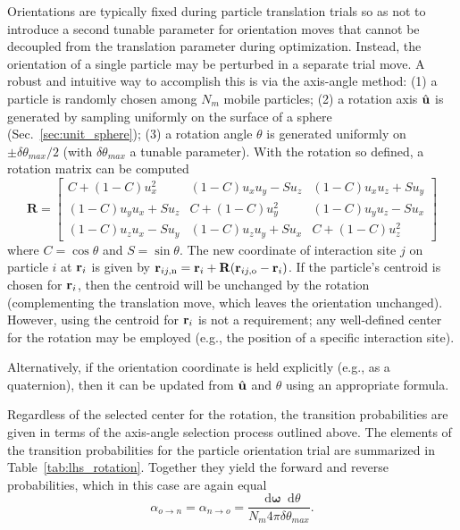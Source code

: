 \documentclass[
  9pt,
  bestpractices,
  pubversion,
]{livecoms}
\newcommand*\diff{\mathop{}\!\mathrm{d}}
\begin{document}
Orientations are typically fixed during particle translation trials so as not to introduce a second tunable parameter for orientation moves that cannot be decoupled from the translation parameter during optimization.
Instead, the orientation of a single particle may be perturbed in a separate trial move.
A robust and intuitive way to accomplish this is via the axis-angle method: (1) a particle is randomly chosen among $N_m$ mobile particles; (2) a rotation axis $\hat {\bf u}$ is generated by sampling uniformly on the surface of a sphere (Sec.~\ref{sec:unit_sphere}); (3) a rotation angle $\theta$ is generated uniformly on $\pm\delta\theta_{max}/2$ (with $\delta\theta_{max}$ a tunable parameter).
With the rotation so defined, a rotation matrix can be computed
\begin{equation}
\mathbf{R} =
\begin{bmatrix}
C + (1 - C) u_x^2 & (1 - C) u_x u_y - S u_z & (1 - C) u_x u_z + S u_y \\
(1 - C) u_y u_x + S u_z & C + (1 - C) u_y^2 & (1 - C) u_y u_z - S u_x \\
(1 - C) u_z u_x - S u_y & (1 - C) u_z u_y + S u_x & C + (1 - C) u_z^2
\end{bmatrix}
\label{eq:rotation_matrix}
\end{equation}
where $C =\cos\theta$ and $S = \sin\theta$.
The new coordinate of interaction site $j$ on particle $i$ at ${\bf r}_i$ is given by ${{\bf r}_{ij,{\rm n}}={\bf r}_{i}}+{\mathbf R}({\bf r}_{ij,{\rm o}}-{\bf r}_i)$.
If the particle's centroid is chosen for ${\bf r}_i$, then the centroid will be unchanged by the rotation (complementing the translation move, which leaves the orientation unchanged).
However, using the centroid for ${\bf r}_i$ is not a requirement; any well-defined center for the rotation may be employed (e.g., the position of a specific interaction site).

Alternatively, if the orientation coordinate is held explicitly (e.g., as a quaternion), then it can be updated from $\hat{\bf u}$ and $\theta$ using an appropriate formula.

Regardless of the selected center for the rotation, the transition probabilities are given in terms of the axis-angle selection process outlined above.
The elements of the transition probabilities for the particle orientation trial are summarized in Table~\ref{tab:lhs_rotation}.
Together they yield the forward and reverse probabilities, which in this case are again equal
\begin{equation}
  \alpha_{o\rightarrow n}=\alpha_{n\rightarrow o} = \frac{\diff\mathbf{\omega}\diff\theta}{N_m 4\pi\delta\theta_{max}}.
\label{eq:lhs_rhs_rot_fwdrev}
\end{equation}
\end{document}
